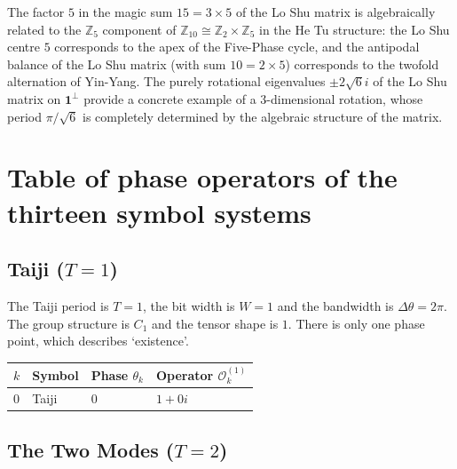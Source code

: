 \begin{remark}\label{rem:luoshu_hetu_interface_yijing}
The factor $5$ in the magic sum $15 = 3 \times 5$ of the Lo Shu matrix is algebraically related to the $\mathbb{Z}_5$ component of $\mathbb{Z}_{10} \cong \mathbb{Z}_2 \times \mathbb{Z}_5$ in the He Tu structure: the Lo Shu centre $5$ corresponds to the apex of the Five-Phase cycle, and the antipodal balance of the Lo Shu matrix (with sum $10 = 2 \times 5$) corresponds to the twofold alternation of Yin-Yang. The purely rotational eigenvalues $\pm 2\sqrt{6}i$ of the Lo Shu matrix on $\mathbf{1}^\perp$ provide a concrete example of a $3$-dimensional rotation, whose period $\pi/\sqrt{6}$ is completely determined by the algebraic structure of the matrix.
\end{remark}

\section{Table of phase operators of the thirteen symbol systems}

\begingroup
\setlength{\tabcolsep}{4pt}

\subsection{\texorpdfstring{Taiji ($T=1$)}{Taiji (T=1)}}

\begin{definition}\label{def:taiji_operators}
The Taiji period is $T=1$, the bit width is $W=1$ and the bandwidth is $\Delta\theta=2\pi$. The group structure is $C_1$ and the tensor shape is $1$. There is only one phase point, which describes `existence'.
\end{definition}

\begin{center}
\begin{tabular}{>{\centering\arraybackslash}p{1.2cm}>{\centering\arraybackslash}p{2cm}>{\centering\arraybackslash}p{2.5cm}>{\centering\arraybackslash}p{3.5cm}}
\toprule
$k$ & Symbol & Phase $\theta_k$ & Operator $\mathcal{O}_k^{(1)}$ \\
\midrule
$0$ & Taiji & $0$ & $1+0i$ \\
\bottomrule
\end{tabular}
\end{center}

\subsection{\texorpdfstring{The Two Modes ($T=2$)}{The Two Modes (T=2)}}

